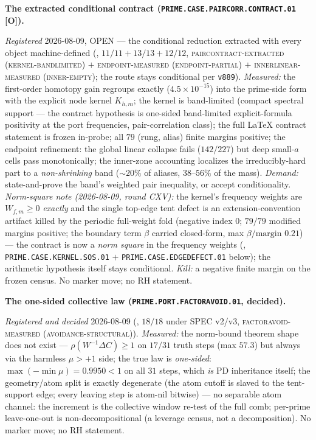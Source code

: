 \documentclass[11pt,a4paper]{article}
\begin{document}
\par\smallskip\noindent\textbf{The extracted conditional
contract
(\texttt{PRIME.CASE.PAIRCORR.\allowbreak CONTRACT.01} [O]).}
{\sloppy
\emph{Registered} 2026-08-09, OPEN --- the conditional
reduction extracted with every object machine-defined
(, $11/11 + 13/13 +
12/12$, \textsc{paircontract-extracted (kernel-bandlimited)}
$+$ \textsc{endpoint-measured (endpoint-partial)} $+$
\textsc{innerlinear-measured (inner-empty)}; the route stays
conditional per \texttt{v889}).  \emph{Measured:} the
first-order homotopy gain regroups exactly
($4.5\times10^{-15}$) into the prime-side form with the
explicit node kernel $K_{h,m}$; the kernel is band-limited
(compact spectral support --- the contract hypothesis is
one-sided band-limited explicit-formula positivity at the port
frequencies, pair-correlation class); the full LaTeX contract
statement is frozen in-probe; all $79$ (rung, alias) finite
margins positive; the endpoint refinement: the global linear
collapse fails ($142/227$) but deep small-$a$ cells pass
monotonically; the inner-zone accounting localizes the
irreducibly-hard part to a \emph{non-shrinking} band
(${\sim}20\%$ of aliases, $38$--$56\%$ of the mass).
\emph{Demand:} state-and-prove the band's weighted pair
inequality, or accept conditionality.  \emph{Norm-square note
(2026-08-09, round CXV):} the kernel's frequency weights are
$W_{f,m} \ge 0$ \emph{exactly} and the single top-edge tent
defect is an extension-convention artifact killed by the
periodic full-weight fold (negative index $0$; $79/79$ modified
margins positive; the boundary term $\beta$ carried closed-form,
max $\beta/\mathrm{margin}$ $0.21$) --- the contract is now a
\emph{norm square} in the frequency weights
(,
\texttt{PRIME.CASE.KERNEL.SOS.01} $+$
\texttt{PRIME.CASE.EDGEDEFECT.01} below); the arithmetic
hypothesis itself stays conditional.  \emph{Kill:} a negative
finite margin on the frozen census.  No marker move; no RH
statement.\par}

\par\smallskip\noindent\textbf{The one-sided collective law
(\texttt{PRIME.PORT.\allowbreak FACTORAVOID.01}, decided).}
{\sloppy
\emph{Registered and decided} 2026-08-09
(, $18/18$ under SPEC v2/v3,
\textsc{factoravoid-measured (avoidance-structural)}).
\emph{Measured:} the norm-bound theorem shape does not exist
--- $\rho(W^{-1}\Delta C) \ge 1$ on $17/31$ truth steps (max
$57.3$) but always via the harmless $\mu > +1$ side; the true
law is \emph{one-sided}: $\max(-\min\mu) = 0.9950 < 1$ on all
$31$ steps, which \emph{is} PD inheritance itself; the
geometry/atom split is exactly degenerate (the atom cutoff is
slaved to the tent-support edge; every leaving step is
atom-nil bitwise) --- no separable atom channel: the increment
is the collective window re-test of the full comb; per-prime
leave-one-out is non-decompositional (a leverage census, not a
decomposition).  No marker move; no RH statement.\par}
\end{document}
